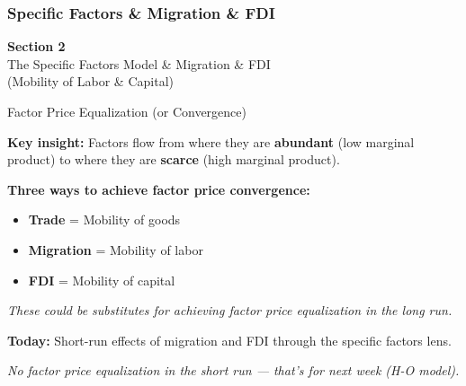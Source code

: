 \documentclass{beamer}
\begin{document}
\subsubsection{Specific Factors \& Migration \& FDI}


\begin{frame}

\vspace{2cm}

\centering
{\LARGE \textbf{Section 2}} \\[0.5cm]
{\Large The Specific Factors Model \& Migration \& FDI} \\[0.3cm]
{\large (Mobility of Labor \& Capital)}

\vfill

\end{frame}


\begin{frame}{Factor Price Equalization (or Convergence)}

\textbf{Key insight:} Factors flow from where they are \textbf{abundant} (low marginal product) to where they are \textbf{scarce} (high marginal product).

\vspace{0.5cm}

\textbf{Three ways to achieve factor price convergence:}
\begin{itemize}
    \item \textbf{Trade} = Mobility of goods
    \item \textbf{Migration} = Mobility of labor
    \item \textbf{FDI} = Mobility of capital
\end{itemize}

\vspace{0.3cm}

\textit{These could be substitutes for achieving factor price equalization in the long run.}

\vspace{0.5cm}

\textbf{Today:} Short-run effects of migration and FDI through the specific factors lens.

\vspace{0.2cm}

\textit{No factor price equalization in the short run --- that's for next week (H-O model).}

\end{frame}
\end{document}
